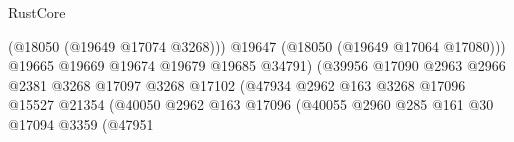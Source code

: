 \begin{lexlean}{RustCore}
\begin{coremodule}
                                                                  (@18050 (@19649 @17074 @3268)))
                                                                @19647
                                                                (@18050 (@19649 @17064 @17080)))
                                                              @19665
                                                              @19669
                                                              @19674
                                                              @19679
                                                              @19685
                                                              @34791)
                                                            (@39956
                                                              @17090
                                                              @2963
                                                              @2966
                                                              @2381
                                                              @3268
                                                              @17097
                                                              @3268
                                                              @17102
                                                              (@47934
                                                                @2962
                                                                @163
                                                                @3268
                                                                @17096
                                                                @15527
                                                                @21354
                                                                (@40050
                                                                  @2962
                                                                  @163
                                                                  @17096
                                                                  (@40055
                                                                    @2960
                                                                    @285
                                                                    @161
                                                                    @30
                                                                    @17094
                                                                    @3359
                                                                    (@47951

\end{coremodule}
\end{lexlean}
